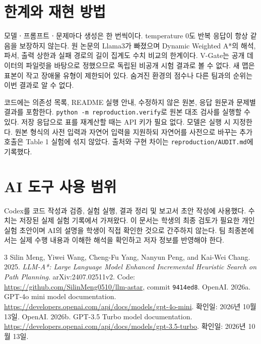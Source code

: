 \documentclass[11pt]{article}
\begin{document}
\section{한계와 재현 방법}
모델ㆍ프롬프트ㆍ문제마다 생성은 한 번씩이다. temperature 0도 반복 응답이 항상 같음을 보장하지 않는다. 원 논문의 Llama3가 빠졌으며 Dynamic Weighted A*의 해석, 파서, 출력 상한과 실패 경로의 길이 집계도 수치 비교의 한계이다. V-Gate는 공개 데이터의 파일럿을 바탕으로 정했으므로 독립된 비공개 시험 결과로 볼 수 없다. 새 맵은 표본이 작고 장애물 유형이 제한되어 있다. 숨겨진 환경의 점수나 다른 팀과의 순위는 이번 결과로 알 수 없다.

코드에는 의존성 목록, README 실행 안내, 수정하지 않은 원본, 응답 원문과 문제별 결과를 포함한다. \texttt{python -m reproduction.verify}로 원본 대조 검사를 실행할 수 있다. 저장 응답으로 표를 재계산할 때는 API 키가 필요 없다. 모델은 실행 시 지정한다. 원본 형식의 사전 입력과 자연어 입력을 지원하되 자연어를 사전으로 바꾸는 추가 호출은 Table 1 실험에 섞지 않았다. 출처와 구현 차이는 \texttt{reproduction/AUDIT.md}에 기록했다.

\section{AI 도구 사용 범위}
Codex를 코드 작성과 검증, 실험 실행, 결과 정리 및 보고서 초안 작성에 사용했다. 수치는 저장된 실제 실험 기록에서 가져왔다. 이 문서는 학생의 최종 검토가 필요한 개인 실험 초안이며 AI의 설명을 학생이 직접 확인한 것으로 간주하지 않는다. 팀 최종본에서는 실제 수행 내용과 이해한 해석을 확인하고 저자 정보를 반영해야 한다.

\noindent\begin{minipage}{\columnwidth}
\begin{thebibliography}{3}
 Silin Meng, Yiwei Wang, Cheng-Fu Yang, Nanyun Peng, and Kai-Wei Chang. 2025. \emph{LLM-A*: Large Language Model Enhanced Incremental Heuristic Search on Path Planning}. arXiv:2407.02511v2. Code: \url{https://github.com/SilinMeng0510/llm-astar}, commit \texttt{9414ed8}.
 OpenAI. 2026a. GPT-4o mini model documentation. \url{https://developers.openai.com/api/docs/models/gpt-4o-mini}. 확인일: 2026년 10월 13일.
 OpenAI. 2026b. GPT-3.5 Turbo model documentation. \url{https://developers.openai.com/api/docs/models/gpt-3.5-turbo}. 확인일: 2026년 10월 13일.
\end{thebibliography}
\end{minipage}
\end{document}
